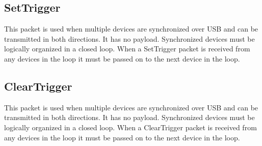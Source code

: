 \documentclass[a4paper,11pt]{article}
\begin{document}
\subsection{SetTrigger}
This packet is used when multiple devices are synchronized over USB and can be transmitted in both directions. It has no payload. Synchronized devices must be logically organized in a closed loop. When a SetTrigger packet is received from any devices in the loop it must be passed on to the next device in the loop.

\subsection{ClearTrigger}
This packet is used when multiple devices are synchronized over USB and can be transmitted in both directions. It has no payload. Synchronized devices must be logically organized in a closed loop. When a ClearTrigger packet is received from any devices in the loop it must be passed on to the next device in the loop.
\end{document}
